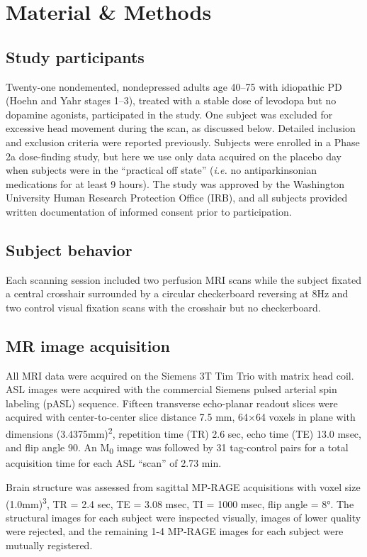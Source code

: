 \section{Material \& Methods}

\subsection{Study participants}
Twenty-one nondemented, nondepressed adults age 40–75 with idiopathic PD (Hoehn and Yahr stages 1–3),\cite{6067254} treated with a stable dose of levodopa but no dopamine agonists, participated in the study. One subject was excluded for excessive head movement during the scan, as discussed below. Detailed inclusion and exclusion criteria were reported previously.\cite{SYN115_2010_AAN_RCT} Subjects were enrolled in a Phase 2a dose-finding study,\cite{Black_2010} but here we use only data acquired on the placebo day when subjects were in the ``practical off state'' (\textit{i.e.} no antiparkinsonian medications for at least 9 hours). The study was approved by the Washington University Human Research Protection Office (IRB), and all subjects provided written documentation of informed consent prior to participation.

\subsection{Subject behavior}
Each scanning session included two perfusion MRI scans while the subject fixated a central crosshair surrounded by a circular checkerboard reversing at 8Hz and two control visual fixation scans with the crosshair but no checkerboard. 

\subsection{MR image acquisition}
All MRI data were acquired on the Siemens 3T Tim Trio with matrix head coil. ASL images were acquired with the commercial Siemens pulsed arterial spin labeling (pASL) sequence.\cite{Wang_2003} Fifteen transverse echo-planar readout slices were acquired with center-to-center slice distance 7.5 mm, 64$\times$64 voxels in plane with dimensions (3.4375mm)\textsuperscript{2}, repetition time (TR) 2.6 sec, echo time (TE) 13.0 msec, and flip angle 90\textdegree. An M\textsubscript{0} image was followed by 31 tag-control pairs for a total acquisition time for each ASL ``scan'' of 2.73 min.

Brain structure was assessed from sagittal MP-RAGE acquisitions with voxel size (1.0mm)\textsuperscript{3}, TR = 2.4 sec, TE = 3.08 msec, TI = 1000 msec, flip angle = 8°. The structural images for each subject were inspected visually, images of lower quality were rejected, and the remaining 1-4 MP-RAGE images for each subject were mutually registered.

